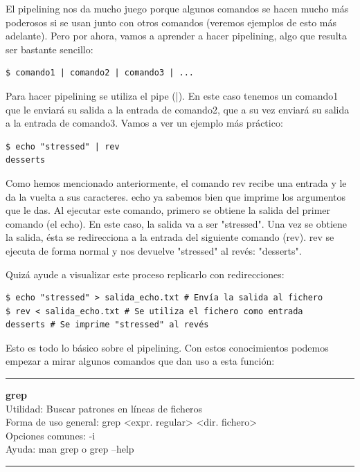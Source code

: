 El pipelining nos da mucho juego porque algunos comandos se hacen mucho más poderosos si se usan junto con otros comandos (veremos ejemplos de esto más adelante). Pero por ahora, vamos a aprender a hacer pipelining, algo que resulta ser bastante sencillo:

\begin{tcolorbox-code}
\begin{lstlisting}
$ comando1 | comando2 | comando3 | ...
\end{lstlisting}
\end{tcolorbox-code}

Para hacer pipelining se utiliza el pipe (|). En este caso tenemos un comando1 que le enviará su salida a la entrada de comando2, que a su vez enviará su salida a la entrada de comando3. Vamos a ver un ejemplo más práctico:

\begin{tcolorbox-code}
\begin{lstlisting}
$ echo "stressed" | rev
desserts
\end{lstlisting}
\end{tcolorbox-code}

Como hemos mencionado anteriormente, el comando rev recibe una entrada y le da la vuelta a sus caracteres. echo ya sabemos bien que imprime los argumentos que le das. Al ejecutar este comando, primero se obtiene la salida del primer comando (el echo). En este caso, la salida va a ser "stressed". Una vez se obtiene la salida, ésta se redirecciona a la entrada del siguiente comando (rev). rev se ejecuta de forma normal y nos devuelve "stressed" al revés: "desserts".

Quizá ayude a visualizar este proceso replicarlo con redirecciones:

\begin{tcolorbox-code}
\begin{lstlisting}
$ echo "stressed" > salida_echo.txt # Envía la salida al fichero
$ rev < salida_echo.txt # Se utiliza el fichero como entrada
desserts # Se imprime "stressed" al revés
\end{lstlisting}
\end{tcolorbox-code}

Esto es todo lo básico sobre el pipelining. Con estos conocimientos podemos empezar a mirar algunos comandos que dan uso a esta función:

\begin{center}
  \rule{15cm}{0.4pt}
\end{center}
\textbf{grep}\\
Utilidad: Buscar patrones en líneas de ficheros\\
Forma de uso general: grep <expr. regular> <dir. fichero>\\
Opciones comunes: -i\\
Ayuda: man grep o grep --help
\begin{center}
  \rule{15cm}{0.4pt}
\end{center}


